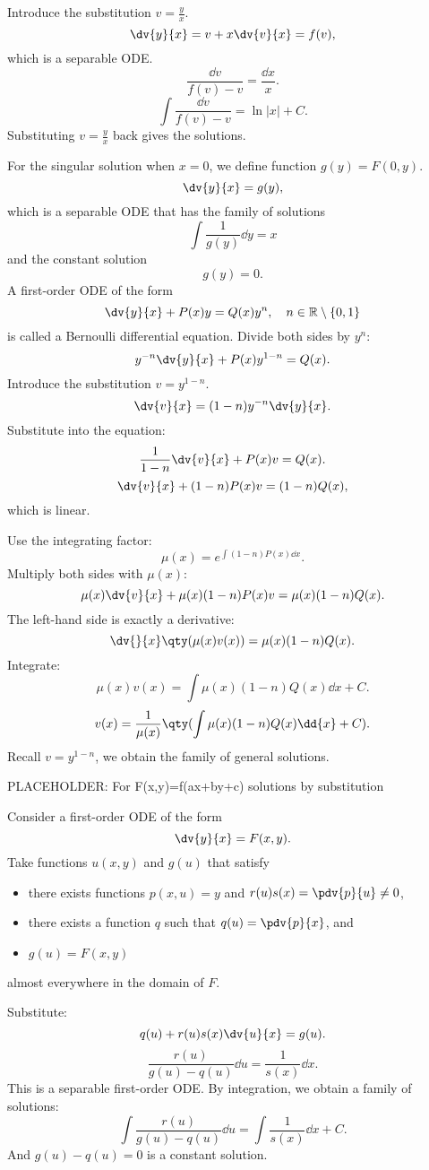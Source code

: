 \documentclass[a4paper,12pt]{report}
\begin{document}
Introduce the substitution $v=\frac{y}{x}$.
\[\dv{y}{x}=v+x\dv{v}{x}=f(v),\]
which is a separable ODE.
\[\frac{\dd{v}}{f(v)-v}=\frac{\dd{x}}{x}.\]
\[\int\frac{\dd{v}}{f(v)-v}=\ln|x|+C.\]
Substituting $v=\frac{y}{x}$ back gives the solutions.

For the singular solution when $x=0$, we define function $g(y)=F(0,y)$.
\[\dv{y}{x}=g(y),\]
which is a separable ODE that has the family of solutions
\[\int\frac{1}{g(y)}\dd{y}=x\]
and the constant solution
\[g(y)=0.\]
A first-order ODE of the form
\[\dv{y}{x}+P(x)y=Q(x)y^n,\quad n\in\mathbb{R}\setminus\{0,1\}\]
is called a Bernoulli differential equation.
Divide both sides by $y^n$:
\[y^{-n}\dv{y}{x}+P(x)y^{1-n}=Q(x).\]
Introduce the substitution $v=y^{1-n}$.
\[\dv{v}{x}=(1-n)y^{-n}\dv{y}{x}.\]
Substitute into the equation:
\[\frac{1}{1-n}\dv{v}{x}+P(x)v=Q(x).\]
\[\dv{v}{x}+(1-n)P(x)v=(1-n)Q(x),\]
which is linear.

Use the integrating factor:
\[\mu(x)=e^{\int (1-n)P(x)\dd{x}}.\]
Multiply both sides with $\mu(x)$:
\[\mu(x)\dv{v}{x}+\mu(x)(1-n)P(x)v=\mu(x)(1-n)Q(x).\]
The left-hand side is exactly a derivative:
\[\dv{}{x}\qty(\mu(x)v(x))=\mu(x)(1-n)Q(x).\]
Integrate:
\[\mu(x)v(x)=\int\mu(x)(1-n)Q(x)\dd{x}+C.\]
\[v(x)=\frac{1}{\mu(x)}\qty(\int\mu(x)(1-n)Q(x)\dd{x}+C).\]
Recall $v=y^{1-n}$, we obtain the family of general solutions.

PLACEHOLDER: For F(x,y)=f(ax+by+c) solutions by substitution 



Consider a first-order ODE of the form
\[\dv{y}{x}=F(x,y).\]
Take functions $u(x,y)$ and $g(u)$ that satisfy
\begin{itemize}
    \item there exists functions $p(x,u)=y$ and $r(u)s(x)=\pdv{p}{u}\neq 0$,
    \item there exists a function $q$ such that $q(u)=\pdv{p}{x}$, and
    \item $g(u)=F(x,y)$
\end{itemize}
almost everywhere in the domain of $F$.

Substitute:
\[q(u)+r(u)s(x)\dv{u}{x}=g(u).\]
\[\frac{r(u)}{g(u)-q(u)}\dd{u}=\frac{1}{s(x)}\dd{x}.\]
This is a separable first-order ODE. By integration, we obtain a family of solutions:
\[\int\frac{r(u)}{g(u)-q(u)}\dd{u}=\int\frac{1}{s(x)}\dd{x}+C.\]
And $g(u)-q(u)=0$ is a constant solution.
\end{document}

